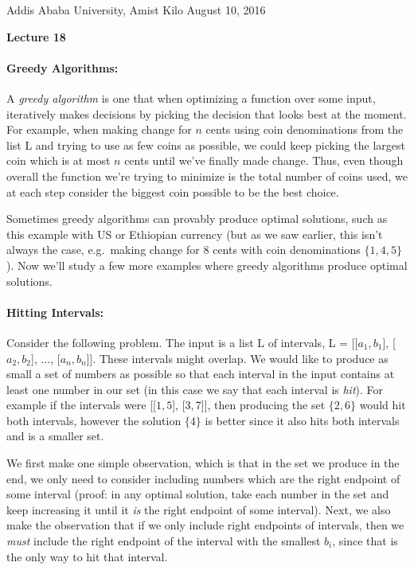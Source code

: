 \documentclass[11pt]{article}
\newlength{\toppush}
\newcommand{\htitle}[2]{\noindent\vspace*{-\toppush}\newline\parbox{6.5in}
 {\large Addis Ababa University, Amist Kilo \hfill #1\newline
\hspace*{\fill}{\bf Algorithms and Programming for High Schoolers} \hspace*{\fill} \newline
\mbox{}\hrulefill\mbox{}}\vspace*{1ex}\mbox{}\newline
\begin{center}{\Large\bf #2}\end{center}}
\begin{document}
\htitle{August 10, 2016}{Lecture 18}

\paragraph{\Large Greedy Algorithms:}
A {\em greedy algorithm} is one that when optimizing a function over
some input, iteratively makes decisions by picking the decision that
looks best at the moment.  For example, when making change for $n$
cents using coin denominations from the list L and trying to use as
few coins as possible, we could keep picking
the largest coin which is at most $n$ cents until we've finally made
change.  Thus, even though overall the function we're trying to
minimize is the total number of coins used, we at
each step consider the biggest coin possible to be the best choice.

Sometimes greedy algorithms can provably produce optimal
solutions, such as this example with US or Ethiopian currency (but as
we saw earlier, this isn't always the case, e.g.\ making change for
$8$ cents with coin denominations $\{1,4,5\}$).  Now we'll study a few
more examples where greedy algorithms produce optimal solutions.

\paragraph{Hitting Intervals:} Consider the following problem.  The
input is a list L of intervals, L = [[$a_1,b_1$], [$a_2,b_2$],
$\ldots$, [$a_n, b_n$]].  These intervals might overlap.  We would
like to produce as small a set of numbers as possible so that each
interval in the input contains at least one number in our set (in this
case we say that each interval is {\em hit}).  For
example if the intervals were [[$1,5$], [$3,7$]], then producing the
set $\{2,6\}$ would hit both intervals, however the solution $\{4\}$
is better since it also hits both intervals and is a smaller set.

We first make one simple observation, which is that in the set we
produce in the end, we only need to consider including numbers which
are the right endpoint of some interval (proof: in any optimal
solution, take
each number in the set and keep increasing it until it {\em is} the
right endpoint of some interval). Next, we also make the observation
that if we only include right endpoints of intervals, then we {\em
  must} include the right endpoint of the interval with the smallest
$b_i$, since that is the only way to hit that interval.
\end{document}
